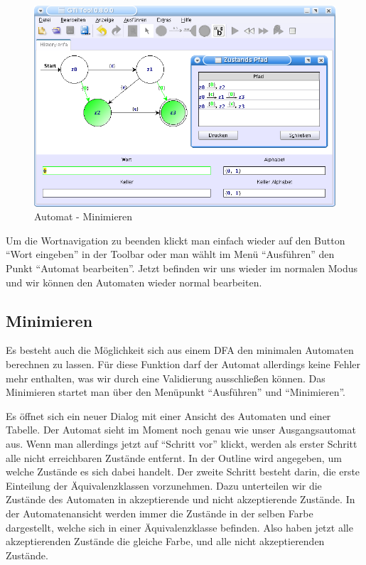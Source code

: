     \begin{figure}[h]
  \begin{center}
  \includegraphics[width=12cm]{images/history_path.png}
  \caption{Automat - Minimieren}
  \end{center}
  \end{figure}
  
  Um die Wortnavigation zu beenden klickt man einfach wieder auf den Button
  "`Wort eingeben"' in der Toolbar oder man wählt im Menü "`Ausführen"' den
  Punkt "`Automat bearbeiten"'. Jetzt befinden wir uns wieder im normalen Modus
  und wir können den Automaten wieder normal bearbeiten.
   
\subsection{Minimieren}
  
  Es besteht auch die Möglichkeit sich aus einem DFA den minimalen Automaten
  berechnen zu lassen. Für diese Funktion darf der Automat allerdings keine
  Fehler mehr enthalten, was wir durch eine Validierung ausschließen können. Das
  Minimieren startet man über den Menüpunkt "`Ausführen"' und
  "`Minimieren"'.\vspace{10pt}
  
  Es öffnet sich ein neuer Dialog mit einer Ansicht des Automaten und einer
  Tabelle. Der Automat sieht im Moment noch genau wie unser Ausgangsautomat
  aus. Wenn man allerdings jetzt auf "`Schritt vor"' klickt, werden als erster
  Schritt alle nicht erreichbaren Zustände entfernt. In der Outline wird
  angegeben, um welche Zustände es sich dabei handelt. Der zweite Schritt
  besteht darin, die erste Einteilung der Äquivalenzklassen vorzunehmen. Dazu
  unterteilen wir die Zustände des Automaten in akzeptierende und nicht
  akzeptierende Zustände. In der Automatenansicht werden immer die Zustände in
  der selben Farbe dargestellt, welche sich in einer Äquivalenzklasse befinden.
  Also haben jetzt alle akzeptierenden Zustände die gleiche Farbe, und alle
  nicht akzeptierenden Zustände.\vspace{10pt}
  
